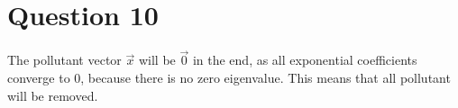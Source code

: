 \documentclass[12pt,a4paper]{article}
\begin{document}
\section*{Question 10}
\begin{solution}
    The pollutant vector $\vec{x}$ will be $\vec{0}$ in the end, as all exponential coefficients converge to 0, because there is no zero eigenvalue. This means that all pollutant will be removed.
\end{solution}
\end{document}
